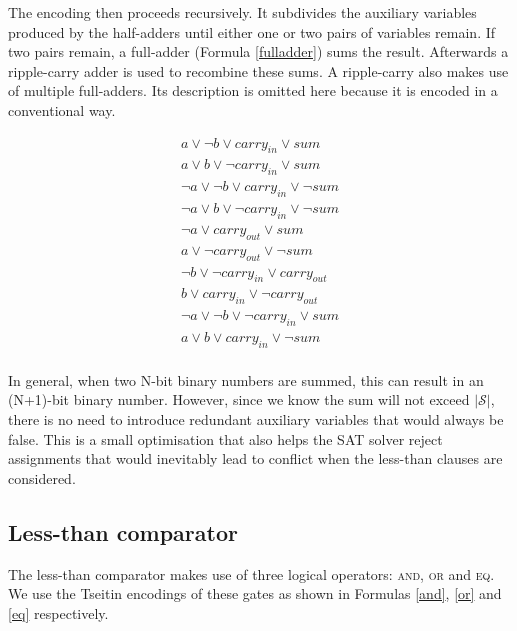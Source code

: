 \documentclass{article}
\begin{document}
\noindent The encoding then proceeds recursively\cite{zhou2020yet}. It
subdivides the auxiliary variables produced by the half-adders until either one
or two pairs of variables remain. If two pairs remain, a full-adder (Formula
\ref{fulladder}) sums the result. Afterwards a ripple-carry adder is used to
recombine these sums. A ripple-carry also makes use of multiple full-adders.
Its description is omitted here because it is encoded in a conventional
way\cite{ripplecarry}.

\begin{equation}
  \label{fulladder}
  \begin{split}
    a \lor \neg{b} \lor carry_{in} \lor sum \\
    a \lor b \lor \neg{carry_{in}} \lor sum \\
    \neg{a} \lor \neg{b} \lor carry_{in} \lor \neg{sum} \\
    \neg{a} \lor b \lor \neg{carry_{in}} \lor \neg{sum} \\
    \neg{a} \lor carry_{out} \lor sum \\
    a \lor \neg{carry_{out}}\lor \neg{sum} \\
    \neg{b} \lor \neg{carry_{in}} \lor carry_{out} \\
    b \lor carry_{in} \lor \neg{carry_{out}} \\
    \neg{a} \lor \neg{b} \lor \neg{carry_{in}} \lor sum \\
    a \lor b \lor carry_{in} \lor \neg{sum} \\
  \end{split}
\end{equation}\break

\noindent In general, when two N-bit binary numbers are summed, this can result
in an (N+1)-bit binary number. However, since we know the sum will not exceed
$\vert \mathscr{S} \vert$, there is no need to introduce redundant auxiliary
variables that would always be false. This is a small optimisation that also
helps the SAT solver reject assignments that would inevitably lead to conflict
when the less-than clauses are considered.

\subsection{Less-than comparator}

The less-than comparator makes use of three logical operators: \textsc{and},
\textsc{or} and \textsc{eq}. We use the Tseitin
encodings\cite{prestwich2009cnf} of these gates as shown in Formulas \ref{and},
\ref{or} and \ref{eq} respectively.
\end{document}
